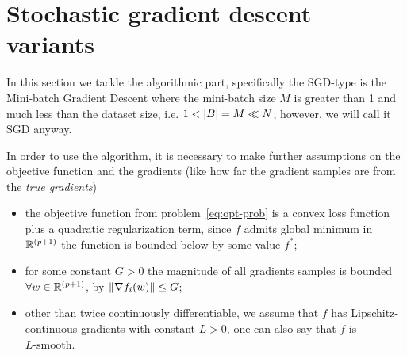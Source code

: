 \section{Stochastic gradient descent variants}\label{sc:sgds}

In this section we tackle the algorithmic part, specifically the SGD-type is the Mini-batch Gradient Descent where the mini-batch size $M$ is greater than 1 and much less than the dataset size, i.e. $1<\lvert B\rvert=M\ll N$, however, we will call it SGD anyway.



In order to use the algorithm, it is necessary to make further assumptions on the objective function and the gradients (like how far the gradient samples are from the \emph{true gradients})
\begin{itemize}
\item the objective function from problem~\eqref{eq:opt-prob} is a convex loss function plus a quadratic regularization term, since $f$ admits global minimum in $\mathbb{R}^{(p+1)}$ the function is bounded below by some value $f^\ast$;%
\item for some constant $G>0$ the magnitude of all gradients samples is bounded $\forall w\in\mathbb{R}^{(p+1)}$, by $\lVert\nabla f_i(w)\rVert\leq G$;
\item other than twice continuously differentiable, we assume that $f$ has Lipschitz-continuous gradients with constant $L>0$, one can also say that $f$ is $L\text{-smooth}$.
\end{itemize}

